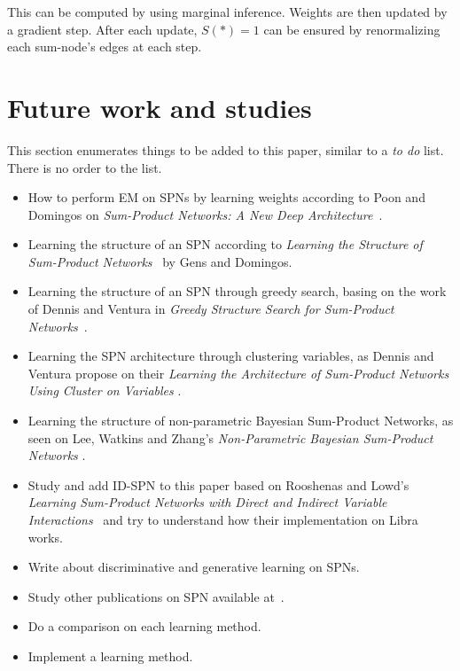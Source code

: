 \documentclass[a4paper,10pt]{article}
\theoremstyle{plain}
\begin{document}
This can be computed by using marginal inference. Weights are then updated by a gradient step.
After each update, $S(*)=1$ can be ensured by renormalizing each sum-node's edges at each step.

\section{Future work and studies}

This section enumerates things to be added to this paper, similar to a \textit{to do} list. There
is no order to the list.

\begin{itemize}
  \item How to perform EM on SPNs by learning weights according to Poon and Domingos on
    \textit{Sum-Product Networks: A New Deep Architecture}~\cite{poon-domingos}.
  \item Learning the structure of an SPN according to \textit{Learning the Structure of
    Sum-Product Networks}~\cite{gens-domingos} by Gens and Domingos.
  \item Learning the structure of an SPN through greedy search, basing on the work of Dennis and
    Ventura in \textit{Greedy Structure Search for Sum-Product Networks}~\cite{greedy-search}.
  \item Learning the SPN architecture through clustering variables, as Dennis and Ventura propose
    on their \textit{Learning the Architecture of Sum-Product Networks Using Cluster on Variables}
    \cite{clustering}.
  \item Learning the structure of non-parametric Bayesian Sum-Product Networks, as seen on Lee,
    Watkins and Zhang's \textit{Non-Parametric Bayesian Sum-Product Networks}
    \cite{non-parametric-bayesian}.
  \item Study and add ID-SPN to this paper based on Rooshenas and Lowd's \textit{Learning
    Sum-Product Networks with Direct and Indirect Variable Interactions}~\cite{id-spn} and try to
    understand how their implementation on Libra~\cite{libra} works.
  \item Write about discriminative and generative learning on SPNs.
  \item Study other publications on SPN available at~\cite{website:spn-uwashington}.
  \item Do a comparison on each learning method.
  \item Implement a learning method.
\end{itemize}
\end{document}
